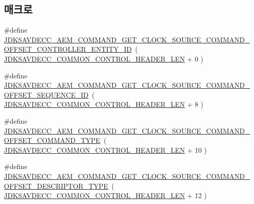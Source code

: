 \subsection*{매크로}
\begin{DoxyCompactItemize}
\item 
\#define \hyperlink{group__command__get__clock__source_ga55aa103afc89a432930dffe5d9b39101}{J\+D\+K\+S\+A\+V\+D\+E\+C\+C\+\_\+\+A\+E\+M\+\_\+\+C\+O\+M\+M\+A\+N\+D\+\_\+\+G\+E\+T\+\_\+\+C\+L\+O\+C\+K\+\_\+\+S\+O\+U\+R\+C\+E\+\_\+\+C\+O\+M\+M\+A\+N\+D\+\_\+\+O\+F\+F\+S\+E\+T\+\_\+\+C\+O\+N\+T\+R\+O\+L\+L\+E\+R\+\_\+\+E\+N\+T\+I\+T\+Y\+\_\+\+ID}~( \hyperlink{group__jdksavdecc__avtp__common__control__header_gaae84052886fb1bb42f3bc5f85b741dff}{J\+D\+K\+S\+A\+V\+D\+E\+C\+C\+\_\+\+C\+O\+M\+M\+O\+N\+\_\+\+C\+O\+N\+T\+R\+O\+L\+\_\+\+H\+E\+A\+D\+E\+R\+\_\+\+L\+EN} + 0 )
\item 
\#define \hyperlink{group__command__get__clock__source_ga20f9c6c1ee7f19cdd1e7e2481a851719}{J\+D\+K\+S\+A\+V\+D\+E\+C\+C\+\_\+\+A\+E\+M\+\_\+\+C\+O\+M\+M\+A\+N\+D\+\_\+\+G\+E\+T\+\_\+\+C\+L\+O\+C\+K\+\_\+\+S\+O\+U\+R\+C\+E\+\_\+\+C\+O\+M\+M\+A\+N\+D\+\_\+\+O\+F\+F\+S\+E\+T\+\_\+\+S\+E\+Q\+U\+E\+N\+C\+E\+\_\+\+ID}~( \hyperlink{group__jdksavdecc__avtp__common__control__header_gaae84052886fb1bb42f3bc5f85b741dff}{J\+D\+K\+S\+A\+V\+D\+E\+C\+C\+\_\+\+C\+O\+M\+M\+O\+N\+\_\+\+C\+O\+N\+T\+R\+O\+L\+\_\+\+H\+E\+A\+D\+E\+R\+\_\+\+L\+EN} + 8 )
\item 
\#define \hyperlink{group__command__get__clock__source_ga96102adafc014c05e4a52c05d2f5def3}{J\+D\+K\+S\+A\+V\+D\+E\+C\+C\+\_\+\+A\+E\+M\+\_\+\+C\+O\+M\+M\+A\+N\+D\+\_\+\+G\+E\+T\+\_\+\+C\+L\+O\+C\+K\+\_\+\+S\+O\+U\+R\+C\+E\+\_\+\+C\+O\+M\+M\+A\+N\+D\+\_\+\+O\+F\+F\+S\+E\+T\+\_\+\+C\+O\+M\+M\+A\+N\+D\+\_\+\+T\+Y\+PE}~( \hyperlink{group__jdksavdecc__avtp__common__control__header_gaae84052886fb1bb42f3bc5f85b741dff}{J\+D\+K\+S\+A\+V\+D\+E\+C\+C\+\_\+\+C\+O\+M\+M\+O\+N\+\_\+\+C\+O\+N\+T\+R\+O\+L\+\_\+\+H\+E\+A\+D\+E\+R\+\_\+\+L\+EN} + 10 )
\item 
\#define \hyperlink{group__command__get__clock__source_ga1a53766ae2accfd857b921de9f98ff56}{J\+D\+K\+S\+A\+V\+D\+E\+C\+C\+\_\+\+A\+E\+M\+\_\+\+C\+O\+M\+M\+A\+N\+D\+\_\+\+G\+E\+T\+\_\+\+C\+L\+O\+C\+K\+\_\+\+S\+O\+U\+R\+C\+E\+\_\+\+C\+O\+M\+M\+A\+N\+D\+\_\+\+O\+F\+F\+S\+E\+T\+\_\+\+D\+E\+S\+C\+R\+I\+P\+T\+O\+R\+\_\+\+T\+Y\+PE}~( \hyperlink{group__jdksavdecc__avtp__common__control__header_gaae84052886fb1bb42f3bc5f85b741dff}{J\+D\+K\+S\+A\+V\+D\+E\+C\+C\+\_\+\+C\+O\+M\+M\+O\+N\+\_\+\+C\+O\+N\+T\+R\+O\+L\+\_\+\+H\+E\+A\+D\+E\+R\+\_\+\+L\+EN} + 12 )

\end{DoxyCompactItemize}
